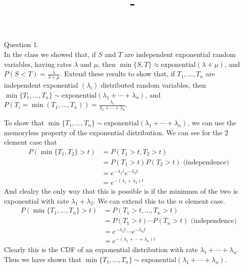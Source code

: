 \documentclass[answers,12pt,addpoints]{exam}
\author{\name}
\title{\course \ - \assignment}
\begin{document}
\maketitle


\newpage
\begin{questions}
    \question Question 1.\\
    In the class we showed that, if \( S \) and \( T \) are independent exponential random variables, having rates \( \lambda \) and \( \mu \), then \(\min\{S, T\} \approx \text{exponential}(\lambda + \mu)\), and \( P(S < T) = \frac{\lambda}{\lambda + \mu} \). Extend these results to show that, if \( T_1, \ldots, T_n \) are independent exponential \((\lambda_i)\) distributed random variables, then \(\min\{T_1, \ldots, T_n\} \sim \text{exponential} (\lambda_1 + \cdots + \lambda_n)\), and \( P(T_i = \min (T_1, \ldots, T_n)) = \frac{\lambda_i}{\lambda_1 + \cdots + \lambda_n} \).
    \begin{solution}
        To show that \(\min\{T_1, \ldots, T_n\} \sim \text{exponential} (\lambda_1 + \cdots + \lambda_n)\), we can use the memoryless property of the exponential distribution. We can see for the 2 element case that 
        \begin{align*}
            P(\min\{T_1, T_2\} > t) &= P(T_1 > t, T_2 > t)\\
            &= P(T_1 > t)P(T_2 > t) \text{ (independence)}\\
            &= e^{-\lambda_1 t}e^{-\lambda_2 t}\\
            &= e^{-(\lambda_1 + \lambda_2)t}
        \end{align*}
        And clealry the only way that this is possible is if the minimum of the two is exponential with rate \(\lambda_1 + \lambda_2\). We can extend this to the \(n\) element case. \\
        \begin{align*}
            P(\min\{T_1, \ldots, T_n\} > t) &= P(T_1 > t, \ldots, T_n > t)\\
            &= P(T_1 > t) \cdots P(T_n > t) \text{ (independence)}\\
            &= e^{-\lambda_1 t} \cdots e^{-\lambda_n t}\\
            &= e^{-(\lambda_1 + \cdots + \lambda_n)t}
        \end{align*}
        Clearly this is the CDF of an exponential distribution with rate \(\lambda_1 + \cdots + \lambda_n\).\\
        Thus we have shown that \(\min\{T_1, \ldots, T_n\} \sim \text{exponential} (\lambda_1 + \cdots + \lambda_n)\).\\\\

\end{solution}
\end{questions}
\end{document}
